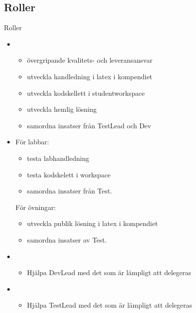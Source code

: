 \documentclass{slides}
\begin{document}
\subsection{Roller}
\begin{Slide}{Roller}\scriptsize
\begin{itemize}\scriptsize
\item {} 

\begin{itemize}\scriptsize
\item övergripande kvalitets- och leveransansvar
\item utveckla handledning i latex i kompendiet
\item utveckla kodskellett i studentworkspace
\item utveckla hemlig lösning
\item samordna insatser från TestLead och Dev
\end{itemize}

\item {} 
\vspace{-1em}
\begin{multicols}{2}
För labbar:
\begin{itemize}\scriptsize
\item testa labhandledning
\item testa kodskelett i workspace
\item samordna insatser från Test. 
\end{itemize}

\columnbreak

För övningar:
\begin{itemize}\scriptsize
\item utveckla publik lösning i latex i kompendiet
\item samordna insatser av Test.
\end{itemize}
\end{multicols}

\item {} 
\begin{itemize}\scriptsize
\item Hjälpa DevLead med det som är lämpligt att delegeras
\end{itemize}

\item {}
\begin{itemize}\scriptsize
\item Hjälpa TestLead med det som är lämpligt att delegeras
\end{itemize}
\end{itemize}
\end{Slide}
\end{document}
